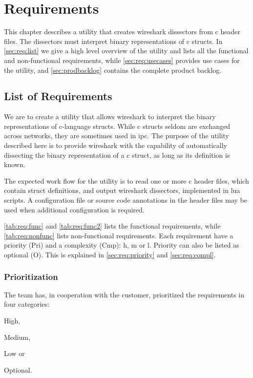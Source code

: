 \chapter{Requirements}
\label{chap:req:requirements}
This chapter describes a \gls{utility} that creates \Gls{wireshark} \glspl{dissector} from \Gls{c}
\gls{header} files. The \glspl{dissector} must interpret \gls{binary} representations of \Gls{c}
\glspl{struct}. In \autoref{sec:req:list} we give a high level overview of the
\gls{utility} and lists all the functional and non-functional requirements, 
while \autoref{sec:req:usecases} provides use cases for the \gls{utility}, 
and \autoref{sec:prodbacklog} contains the complete product backlog.


\section{List of Requirements}
\label{sec:req:list}
We are to create a \gls{utility} that allows \Gls{wireshark} to interpret the \gls{binary}
representations of \Gls{c}-language \glspl{struct}. While \Gls{c} \glspl{struct} seldom are exchanged
across networks, they are sometimes used in \gls{ipc}. The
purpose of the \gls{utility} described here is to provide \Gls{wireshark} with the
capability of automatically dissecting the \gls{binary} representation of a \Gls{c} \gls{struct},
as long as its definition is known.

The expected work flow for the \gls{utility} is to read one or more \Gls{c} \gls{header} files,
which contain \gls{struct} definitions, and output \Gls{wireshark} \glspl{dissector}, implemented
in \Gls{lua} scripts. A configuration file or source code annotations in the \gls{header}
files may be used when additional configuration is required.

\autoref{tab:req:func} and \autoref{tab:req:func2} lists the functional requirements,
while \autoref{tab:req:nonfunc} lists non-functional requirements.
Each requirement have a priority (Pri) and a complexity (Cmp): \Gls{h}, 
\Gls{m} or \Gls{l}. Priority can also be listed as optional (O). This is
explained in \autoref{sec:req:priority} and \autoref{sec:req:compl}.

\subsection{Prioritization}
\label{sec:req:priority}
The team has, in cooperation with the customer, prioritized the requirements
in four categories:
\begin{inparaenum}
	\item High,
	\item Medium,
	\item Low or
	\item Optional.
\end{inparaenum} 

